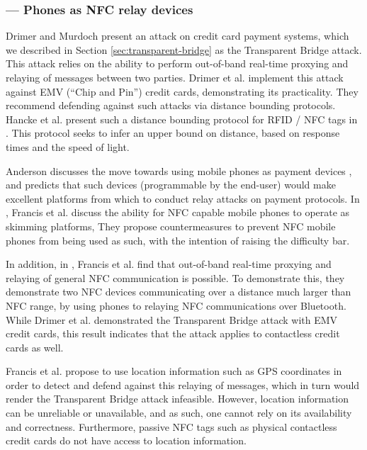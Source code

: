 \subsubsection*{--- Phones as NFC relay devices}

Drimer and Murdoch \cite{Drimer:2007:KYE:1362903.1362910} present an attack on credit card payment systems,
    which we described in Section \ref{sec:transparent-bridge} as the Transparent Bridge attack.
This attack relies on the ability to perform out-of-band real-time proxying and relaying of messages between two parties.
Drimer et al. implement this attack against EMV (``Chip and Pin'') credit cards, demonstrating its practicality.
They recommend defending against such attacks via distance bounding protocols.
Hancke et al. present such a distance bounding protocol for RFID / NFC tags in \cite{hancke2005rfid}.
    This protocol seeks to infer an upper bound on distance, based on response times and the speed of light.

Anderson discusses the move towards using mobile phones as payment devices \cite{anderson2007position},
    and predicts that such devices (programmable by the end-user) would make excellent platforms from which to conduct relay attacks on payment protocols.
In \cite{francis2010security}, Francis et al. discuss the ability for NFC capable mobile phones to operate as skimming platforms,
They propose countermeasures to prevent NFC mobile phones from being used as such, with the intention of raising the difficulty bar.

In addition, in \cite{francis2010practical}, Francis et al. find that out-of-band real-time proxying and relaying of general NFC communication is possible.
To demonstrate this, they demonstrate two NFC devices communicating over a distance much larger than NFC range,
    by using phones to relaying NFC communications over Bluetooth.
While Drimer et al. demonstrated the Transparent Bridge attack with EMV credit cards,
    this result indicates that the attack applies to contactless credit cards as well.

Francis et al. propose to use location information such as GPS coordinates in order to detect and defend against this relaying of messages,
    which in turn would render the Transparent Bridge attack infeasible.
However, location information can be unreliable or unavailable, and as such, one cannot rely on its availability and correctness.
Furthermore, passive NFC tags such as physical contactless credit cards do not have access to location information.

